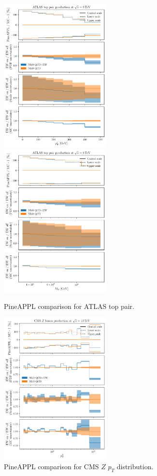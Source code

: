 \begin{figure}
    \centering
    \includegraphics[width=0.5\textwidth]{figures/pineappl_ATLAS_TTB_DIFF_8TEV_LJ_TPT}%
    \includegraphics[width=0.5\textwidth]{figures/pineappl_ATLAS_TTB_DIFF_8TEV_LJ_TTM}
    \caption{PineAPPL comparison for ATLAS top pair.}
    \label{fig:atlastop}
\end{figure}

\begin{figure}
    \centering
    \includegraphics[width=0.5\textwidth]{figures/pineappl_CMS_Z_13_TEV}
    \caption{PineAPPL comparison for CMS $Z$ $p_T$ distribution.}
    \label{fig:cmsZ13TeV}
\end{figure}

